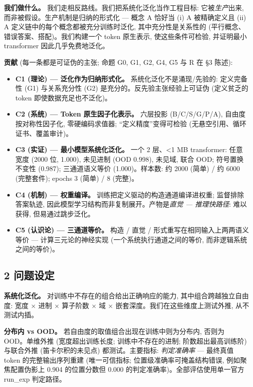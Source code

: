 \documentclass[
]{article}
\providecommand{\tightlist}{%
  \setlength{\itemsep}{0pt}\setlength{\parskip}{0pt}}
\begin{document}
\textbf{我们做什么。} 我们走相反路线。我们把系统化泛化当作工程目标:
它被\emph{生产}出来, 而非被假设。生产机制是归纳的形式化 --- 概念 A
恰好当 (i) A 被精确定义且 (ii) A 定义链中的每个概念都被充分训练时泛化,
其中充分性是关系性的 (平行概念、错误答案、搭配)。我们构建一个 token
原生表示, 使这些条件可检验, 并证明最小 transformer 因此几乎免费地泛化。

\textbf{贡献} (每一条都是可证伪的主张; 命题 G0, G1, G2, G4, G5 与 R 在
§3 陈述):

\begin{itemize}
\tightlist
\item
  \textbf{C1 (理论) --- 泛化作为归纳形式化。} 系统化泛化不是涌现/先验的:
  定义完备性 (G1) 与关系充分性 (G2) 是充分的。反先验主张经验上可证伪
  (定义贫乏的 token 即使数据充足也不泛化)。
\item
  \textbf{C2 (系统) --- Token 原生因子化表示。} 六层投影 (B/C/S/G/P/A),
  自由度按对称性因子化, 零硬编码求值器; ``定义精度''变得可检验
  (无悬空引用、循环证书、覆盖审计)。
\item
  \textbf{C3 (实证) --- 最小模型系统化泛化。} 一个 2 层、\textless1 MB
  transformer: 任意宽度 (2000 位, 1.000), 未见进制 (OOD 0.998), 未见域,
  联合 OOD; 符号置换不变性 (0.987); 三通道语义等价 (1.000)。样本数: 约
  2000 (简单) / 约 6000 (完整套件); epochs 3 (简单) / 8 (完整)。
\item
  \textbf{C4 (机制) --- 权重编译。} 训练把定义驱动的构造通道编译进权重;
  监督排除答案轨迹, 因此模型学习结构而非复制展开。产物是\emph{直觉 ---
  推理快路径}: 难以获得, 但易通过跳步泛化。
\item
  \textbf{C5 (认识论) --- 三通道等价。} 构造 / 直觉 /
  形式重写在相同输入上两两语义等价 --- 计算三元论的神经实现
  (一个系统执行通道之间的等价, 而非逻辑系统之间的等价)。
\end{itemize}

\subsection{2 问题设定}\label{ux95eeux9898ux8bbeux5b9a}

\textbf{系统化泛化。} 对训练中不存在的组合给出正确响应的能力,
其中组合跨越独立自由度: 宽度 × 进制 × 算子阶数 × 域 ×
嵌套深度。我们在这些维度上测试外推, 从不测试内插。

\textbf{分布内 vs OOD。} 若自由度的取值组合出现在训练中则为分布内,
否则为 OOD。单维外推 (宽度超出训练长度; 训练中不存在的进制;
阶数超出最高训练阶) 与联合外推 (笛卡尔积的未见点) 都测试。主要指标:
\emph{判定准确率} --- 最终真值 token 的完整输出序列重建 (唯一可信指标;
位置级准确率可掩盖结构错误, 例如聚焦配置伪影上 0.904 的位置分数但 0.000
的判定准确率)。全部评估使用单一官方 run\_exp 判定路径。
\end{document}

